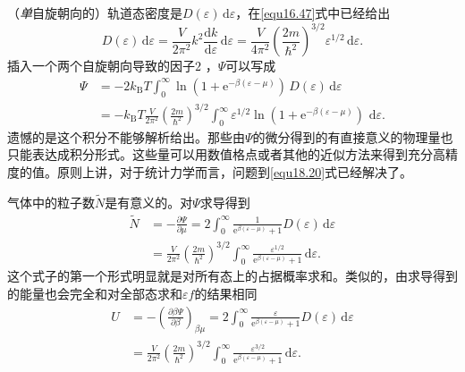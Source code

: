 （{\it 单}自旋朝向的）轨道态密度是$D(\varepsilon)\,\mathrm d\varepsilon$，在\eqref{equ16.47}式中已经给出
\begin{equation}
D(\varepsilon)\,\mathrm d\varepsilon =\frac{V}{2\pi^2}k^2\frac{\mathrm dk}{\mathrm d\varepsilon}\,\mathrm d\varepsilon = \frac{V}{4\pi^2}\left(\frac{2m}{\hbar^2}\right)^{3/2}\varepsilon^{1/2}\,\mathrm d\varepsilon.
\end{equation}
插入一个两个自旋朝向导致的因子$2$%
%
，$\Psi$可以写成
\begin{equation}
\begin{aligned}
\Psi &=-2k_\text{B}T\int_0^{\infty}\ln(1+\mathrm e^{-\beta(\varepsilon-\mu)})\,D(\varepsilon)\,\mathrm d\varepsilon \\
&=-k_\text{B}T\frac{V}{2\pi^2}\left(\frac{2m}{\hbar^2}\right)^{3/2}\int_0^{\infty}\varepsilon^{1/2}\ln(1+\mathrm e^{-\beta(\varepsilon-\mu)})\,\,\mathrm d\varepsilon.
\end{aligned}
\label{equ18.20}
\end{equation}
遗憾的是这个积分不能够解析给出。那些由$\Psi$的微分得到的有直接意义的物理量也只能表达成积分形式。这些量可以用数值格点或者其他的近似方法来得到充分高精度的值。原则上讲，对于统计力学而言，问题到\eqref{equ18.20}式已经解决了。

气体中的粒子数$\tilde N$是有意义的。对$\Psi$求导得到
\begin{equation}
\begin{aligned}
\tilde N&= -\frac{\partial\Psi}{\partial\mu}=2\int_0^\infty\frac{1}{\mathrm e^{\beta(\varepsilon-\mu)}+1}D(\varepsilon)\,\mathrm d\varepsilon \\
&=\frac{V}{2\pi^2}\left(\frac{2m}{\hbar^2}\right)^{3/2}\int_0^\infty\frac{\varepsilon^{1/2}}{\mathrm e^{\beta(\varepsilon-\mu)}+1}\,\mathrm d\varepsilon.
\end{aligned}
\label{equ18.21}
\end{equation}
这个式子的第一个形式明显就是对所有态上的占据概率求和。类似的，由求导得到的能量也会完全和对全部态求和$\varepsilon f$的结果相同
\begin{equation}
\begin{aligned}
U&= -\left(\frac{\partial\beta\Psi}{\partial\beta}\right)_{\beta\mu}=2\int_0^\infty\frac{\varepsilon}{\mathrm e^{\beta(\varepsilon-\mu)}+1}D(\varepsilon)\,\mathrm d\varepsilon \\
&=\frac{V}{2\pi^2}\left(\frac{2m}{\hbar^2}\right)^{3/2}\int_0^\infty\frac{\varepsilon^{3/2}}{\mathrm e^{\beta(\varepsilon-\mu)}+1}\,\mathrm d\varepsilon.
\end{aligned}
\label{equ18.22}
\end{equation}

